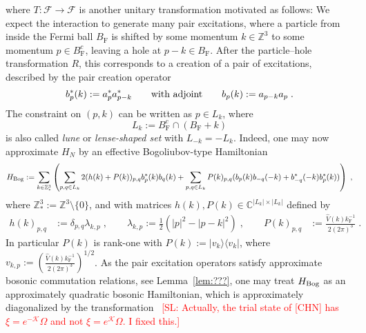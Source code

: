 \documentclass[12pt,a4paper]{article}
\numberwithin{equation}{section}
\newcommand{\cF}{\mathcal{F}}
\newcommand{\cK}{\mathcal{K}}
\newcommand{\CCC}{\mathbb{C}}
\newcommand{\ZZZ}{\mathbb{Z}}
\newcommand{\1}{\mathbb{I}}
\newcommand{\Bog}{\textnormal{Bog}}
\newcommand{\F}{\mathrm{F}}
\theoremstyle{plain}
\theoremstyle{definition}
\theoremstyle{remark}
\theoremstyle{plain}
\theoremstyle{definition}
\theoremstyle{remark}
\begin{document}
where $ T: \cF \to \cF $ is another unitary transformation motivated as follows: We expect the interaction to generate many pair excitations, where a particle from inside the Fermi ball $ B_{\F} $ is shifted by some momentum $ k \in \ZZZ^3 $ to some momentum $ p \in B_{\F}^c $, leaving a hole at $ p-k \in B_{\F} $. After the particle--hole transformation $ R $, this corresponds to a creation of a pair of excitations, described by the pair creation operator
\begin{equation} \label{eq:b}
	b^*_p(k) := a_p^* a_{p-k}^* 
	\qquad \textnormal{with adjoint} \qquad
	b_p(k) := a_{p-k} a_p \;.
\end{equation}
The constraint on $ (p,k) $ can be written as $ p \in L_k $, where
\begin{equation}
	L_k := B_{\F}^c \cap (B_{\F} + k)
\end{equation}
is also called \emph{lune} or \emph{lense-shaped set} with $ L_{-k} = - L_k $. Indeed, one may now approximate $ H_N $ by an effective Bogoliubov-type Hamiltonian~\cite[(1.34)]{CHN23} 
\begin{equation} \label{eq:HBog}
	H_{\Bog}
	:= \sum_{k \in \ZZZ^3_*} \left( \sum_{p,q \in L_k} 2 (h(k) + P(k))_{p,q} b^*_p(k) b_q(k)
		+ \sum_{p,q \in L_k} P(k)_{p,q} (b_p(k) b_{-q}(-k) + b^*_{-q}(-k) b^*_p(k)) \right) \;,
\end{equation}
where $ \ZZZ^3_* := \ZZZ^3 \setminus \{0\} $, and with matrices $ h(k), P(k) \in \CCC^{|L_k| \times |L_k|} $ defined by
\begin{equation} \label{eq:HkPk}
\begin{aligned}
	h(k)_{p,q} &:= \delta_{p,q} \lambda_{k,p} \;, \qquad
	\lambda_{k,p} := \frac 12 (|p|^2 - |p-k|^2) \;, \qquad
	P(k)_{p,q} &:= \frac{\hat{V}(k) k_{\F}^{-1}}{2 (2 \pi)^3} \;.
\end{aligned}
\end{equation}
In particular $ P(k) $ is rank-one with $ P(k) := |v_k \rangle \langle v_k | $, where $ v_{k,p} := \left( \frac{\hat{V}(k) k_{\F}^{-1}}{2 (2 \pi)^3} \right)^{1/2} $. As the pair excitation operators satisfy approximate bosonic commutation relations, see Lemma~\ref{lem:???}, one may treat $ H_{\Bog} $ as an approximately quadratic bosonic Hamiltonian, which is approximately diagonalized by the transformation~\cite[Thm.~1.4]{CHN23} \textcolor{red}{[SL: Actually, the trial state of [CHN] has $ \xi = e^{-\cK} \Omega $ and not $ \xi = e^{\cK} \Omega $. I fixed this.]}
\end{document}
